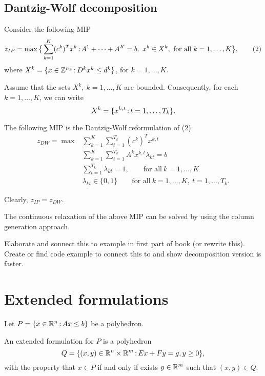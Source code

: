 \documentclass[../open-optimization/open-optimization.tex]{subfiles}
\begin{document}
\subsection{Dantzig-Wolf decomposition}

Consider the following MIP
$$z_{IP}=\max \big\{\sum_{k=1}^K(c^k)^Tx^k{\,:\,} A^1+\dots+A^K=b,\ x^k\in X^k,\ \text{for all}\ k=1,\dots,K\big\},\qquad (2)$$
where $X^k=\{x\in{\mathbb{Z}}^{n_k}{\,:\,} D^kx^k\leq d^k\}$, for $k=1,\dots,K$.

Assume that the sets $X^k,\ k=1,\dots,K$ are bounded. Consequently, for each $k=1,\dots,K$, we can write 
$$X^k=\{x^{k,t}{\,:\,} t=1,\dots, T_k\}.$$

\begin{definition} The following MIP is the Dantzig-Wolf reformulation of (2)
\begin{align*}
z_{DW}= \max &\sum_{k=1}^K\sum_{t=1}^{T_k}(c^k)^Tx^{k,t}\\
&\sum_{k=1}^K\sum_{t=1}^{T_k}A^kx^{k,t}\lambda_{kt}=b\\
&\sum_{t=1}^{T_k}\lambda_{kt}=1,\qquad \text{for all}\ k=1,\dots,K\\
& \lambda_{kt}\in\{0,1\}\qquad \text{for all}\ k=1,\dots,K,\ t=1,\dots, T_k. 
\end{align*}
\end{definition}
\begin{remark}
Clearly, $z_{IP}=z_{DW}$.
\end{remark}

The continuous relaxation of the above MIP can be solved by using the column generation approach.



\begin{todo}
Elaborate and sonnect this to example in first part of book (or rewrite this).  Create or find code example to connect this to and show decomposition  version is faster.
\end{todo}

\section{Extended formulations}

Let $P=\{x\in{\mathbb{R}}^n{\,:\,} Ax\leq b\}$ be a polyhedron. 

\begin{definition} An extended formulation for $P$ is a polyhedron 
$$Q=\{(x,y)\in{\mathbb{R}}^n\times{\mathbb{R}}^m{\,:\,} Ex+Fy=g,y\geq0\},$$
with the property that $x\in P$ if and only if exists $y\in {\mathbb{R}}^m$ such that $(x,y)\in Q$.
\end{definition}
\end{document}
